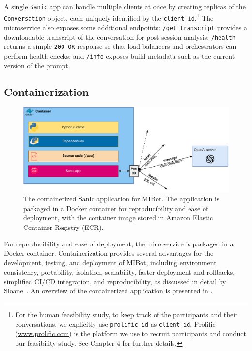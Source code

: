 A single \texttt{Sanic} app can handle multiple clients at once by creating replicas of the \texttt{Conversation} object, each uniquely identified by the \texttt{client\_id}.\footnote{For the human feasibility study, to keep track of the participants and their conversations, we explicitly use \texttt{prolific\_id} as \texttt{client\_id}. Prolific (\url{www.prolific.com}) is the platform we use to recruit participants and conduct our feasibility study. See Chapter 4 for further details.} The microservice also exposes some additional endpoints: \texttt{/get\_transcript} provides a downloadable transcript of the conversation for post-session analysis; \texttt{/health} returns a simple \texttt{200 OK} response so that load balancers and orchestrators can perform health checks; and \texttt{/info} exposes build metadata such as the current version of the prompt.

\subsection{Containerization}

\begin{figure}[ht]
	\centering
	\includegraphics[width=0.7\linewidth]{fig/container.drawio.pdf}
	\caption[Containerized MIBot Application]{The containerized Sanic application for MIBot. The application is packaged in a Docker container for reproducibility and ease of deployment, with the container image stored in Amazon Elastic Container Registry (ECR).}
	\label{fig:containerization}
\end{figure}

For reproducibility and ease of deployment, the microservice is packaged in a Docker container. Containerization provides several advantages for the development, testing, and deployment of MIBot, including environment consistency, portability, isolation, scalability, faster deployment and rollbacks, simplified CI/CD integration, and reproducibility, as discussed in detail by Sloane~\citep{sloane2025containerization}. An overview of the containerized application is presented in .

